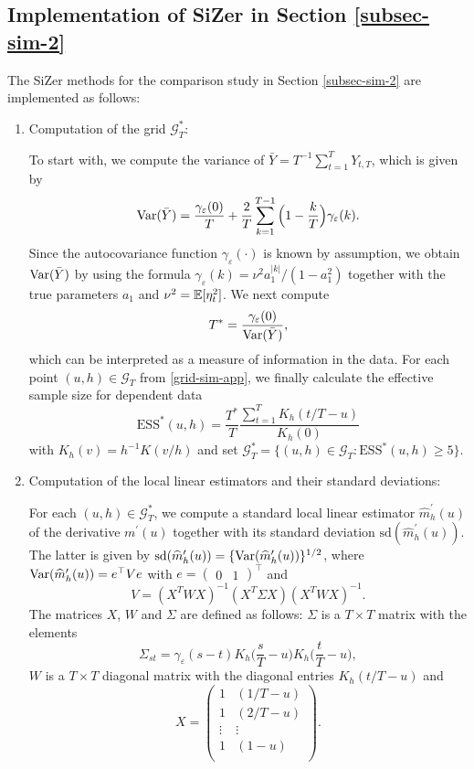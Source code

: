 \FloatBarrier
\newpage
\subsection*{Implementation of SiZer in Section \ref{subsec-sim-2}}


The SiZer methods for the comparison study in Section \ref{subsec-sim-2} are implemented as follows:
\begin{enumerate}[leftmargin=0.75cm,label=(\alph*)]

\item Computation of the grid $\mathcal{G}_T^*$:

To start with, we compute the variance of $\bar{Y} = T^{-1} \sum_{t=1}^T Y_{t,T}$, which is given by
\[ \textnormal{Var}(\bar{Y}) = \frac{\gamma_\varepsilon(0)}{T} + \frac{2}{T} \sum_{k = 1}^{T-1} \Big(1 - \frac{k}{T}\Big)\gamma_\varepsilon(k). \]
Since the autocovariance function $\gamma_{\varepsilon}(\cdot)$ is known by assumption, we obtain $\textnormal{Var}(\bar{Y})$ by using the formula $\gamma_\varepsilon(k) = \nu^2 a_1^{|k|} / (1 - a_1^2)$ together with the true para\-meters $a_1$ and $\nu^2 = \mathbb{E}[\eta_t^2]$. We next compute 
\[ T^* = \frac{\gamma_\varepsilon(0)}{\textnormal{Var}(\bar{Y})}, \]
which can be interpreted as a measure of information in the data. For each point $(u,h) \in \mathcal{G}_T$ from \eqref{grid-sim-app}, we finally calculate the effective sample size for dependent data 
\[ \text{ESS}^*(u, h) = \frac{T^*}{T} \frac{\sum_{t=1}^T K_h(t/T - u)}{K_h(0)} \]
with $K_h(v) = h^{-1} K(v/h)$ and set $\mathcal{G}_T^* = \{ (u,h) \in \mathcal{G}_T: \text{ESS}^*(u, h) \ge 5 \}$. 

\item Computation of the local linear estimators and their standard deviations: 

For each $(u,h) \in \mathcal{G}_T^*$, we compute a standard local linear estimator $\widehat{m}^\prime_h(u)$ of the derivative $m^\prime(u)$ together with its standard deviation $\text{sd}(\widehat{m}^\prime_h(u))$. The latter is given by $\text{sd}(\widehat{m}^\prime_h(u)) = \{ \textnormal{Var}(\widehat{m}^\prime_h(u)) \}^{1/2}$, where $\textnormal{Var}(\widehat{m}^\prime_h(u)) = e^\top V e$ with $e = (\begin{matrix} 0 & 1 \end{matrix})^\top$ and 
\[ V = (X^T W X)^{-1} (X^T \Sigma X) (X^T W X)^{-1}. \]
The matrices $X$, $W$ and $\Sigma$ are defined as follows: $\Sigma$ is a $T \times T$ matrix with the elements
\[ \Sigma_{st} = \gamma_\varepsilon(s-t) K_h\Big( \frac{s}{T} - u \Big) K_h\Big( \frac{t}{T} - u \Big), \]
$W$ is a $T \times T$ diagonal matrix with the diagonal entries $K_h(t/T-u)$ and 
\[ X =   
\begin{pmatrix}
1 & (1/T - u)   \\
1 & (2/T - u)   \\
\vdots & \vdots \\
1 & (1 - u)     \\
\end{pmatrix}. \]


\end{enumerate}
